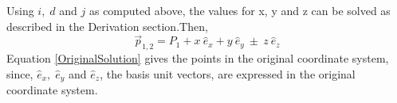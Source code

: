 Using $i, \;  d$ and $j$ as computed above, the values for x, y and z can be solved as described in the Derivation section.Then,
\begin{equation}
	\vec p_{1,2} = P_1 + x \ \hat e_x + y \ \hat e_y \ \pm \ z \ \hat e_z
	\label{OriginalSolution}
\end{equation}
Equation \ref{OriginalSolution} gives the points in the original coordinate system, since, $\hat e_x, \; \hat e_y$ and $\hat e_z$, the basis unit vectors, are expressed in the original coordinate system.